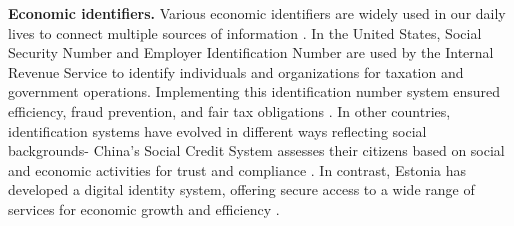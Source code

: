 \textbf{Economic identifiers.}
Various economic identifiers are widely used in our daily lives to connect multiple sources of information \cite{kennickell2016identity}. In the United States, %
Social Security Number and Employer Identification Number are used by the Internal Revenue Service to identify individuals and organizations for taxation and government operations. Implementing this identification number system ensured efficiency, fraud prevention, and fair tax obligations \cite{caplin1963taxpayer}. %
In other countries, identification systems have evolved in different ways reflecting social backgrounds- China's Social Credit System assesses their citizens based on social and economic activities for trust and compliance \cite{creemers2018china,cheung2022datafication}. In contrast, Estonia has developed a digital identity system, offering secure access to a wide range of services %
for economic growth and efficiency \cite{martens2010electronic,tammpuu2019transnational}.



